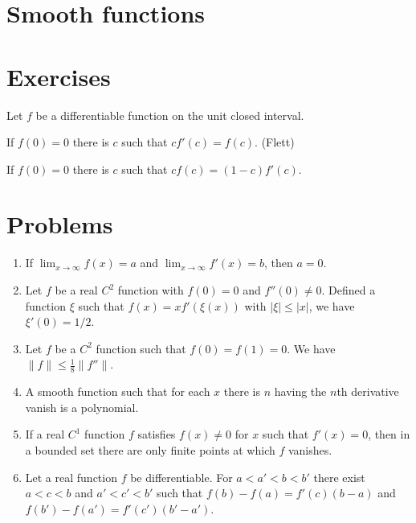 \documentclass{../../large}
\begin{document}
\begin{prb}
\end{prb}


\section{Smooth functions}

\section*{Exercises}
\begin{prb}
Let $f$ be a differentiable function on the unit closed interval.
\begin{parts}
\item If $f(0)=0$ there is $c$ such that $cf'(c)=f(c)$. (Flett)
\item If $f(0)=0$ there is $c$ such that $cf(c)=(1-c)f'(c)$.
\end{parts}
\end{prb}
\begin{prb}
\end{prb}
\begin{prb}
\end{prb}

\section*{Problems}
\begin{enumerate}
\item If $\lim_{x\to\infty}f(x)=a$ and $\lim_{x\to\infty}f'(x)=b$, then $a=0$.
\item Let $f$ be a real $C^2$ function with $f(0)=0$ and $f''(0)\ne0$.
Defined a function $\xi$ such that $f(x)=xf'(\xi(x))$ with $|\xi|\le|x|$, we have $\xi'(0)=1/2$.
\item Let $f$ be a $C^2$ function such that $f(0)=f(1)=0$.
We have $\|f\|\le\frac18\|f''\|$.
\item A smooth function such that for each $x$ there is $n$ having the $n$th derivative vanish is a polynomial.
\item If a real $C^1$ function $f$ satisfies $f(x)\ne0$ for $x$ such that $f'(x)=0$, then in a bounded set there are only finite points at which $f$ vanishes.
\item Let a real function $f$ be differentiable.
For $a<a'<b<b'$ there exist $a<c<b$ and $a'<c'<b'$ such that $f(b)-f(a)=f'(c)(b-a)$ and $f(b')-f(a')=f'(c')(b'-a')$.
\end{enumerate}
\end{document}
